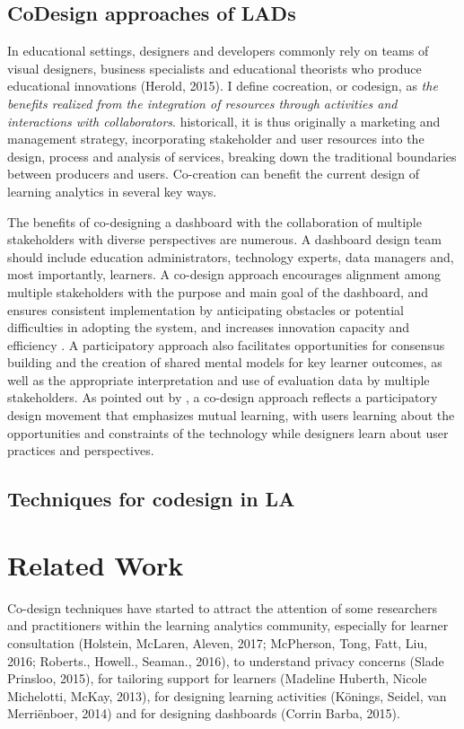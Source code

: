 \documentclass[preprint,12pt]{elsarticle}
\begin{document}
\subsection{CoDesign approaches of LADs}
In educational settings, designers and developers commonly rely on teams of visual designers, business specialists and educational theorists who produce educational innovations (Herold, 2015). I
\citet*{mccoll2012health} define cocreation, or codesign, as \textit{the benefits realized from the integration of resources through activities and interactions with collaborators}. historicall, it is thus originally a marketing and management strategy, incorporating stakeholder and user resources into the design, process and analysis of services, breaking down the traditional boundaries between producers and users. Co-creation can benefit the current design of learning
analytics in several key ways.


The benefits of co-designing a dashboard with the collaboration of multiple stakeholders with diverse perspectives are numerous. A dashboard design team should include education administrators, technology experts, data managers and, most importantly, learners. A co-design approach encourages alignment among multiple stakeholders with the purpose and main goal of the dashboard, and ensures consistent implementation by anticipating obstacles or potential difficulties in adopting the system, and increases innovation capacity and efficiency \citet{boscardin2018twelve}. A participatory approach also facilitates opportunities for consensus building and the creation of shared mental models for key learner outcomes, as well as the appropriate interpretation and use of evaluation data by multiple stakeholders. As pointed out by \citet{schuler1993participatory}, a co-design approach reflects a participatory design movement that emphasizes mutual learning, with users learning about the opportunities and constraints of the technology while designers learn about user practices and perspectives.

\subsection{Techniques for codesign in LA}


\section{Related Work}
Co-design techniques have started to attract the attention of some researchers and
practitioners within the learning analytics community, especially for learner
consultation (Holstein, McLaren,  Aleven, 2017; McPherson, Tong, Fatt,  Liu, 2016;
Roberts., Howell.,  Seaman., 2016), to understand privacy concerns (Slade 
Prinsloo, 2015), for tailoring support for learners (Madeline Huberth, Nicole Michelotti,
 McKay, 2013), for designing learning activities (Könings, Seidel,  van Merriënboer,
2014) and for designing dashboards (Corrin  Barba, 2015).
\end{document}
